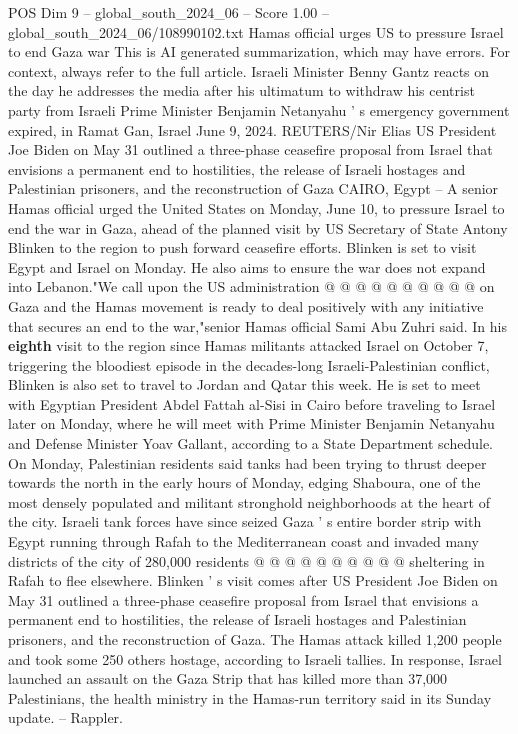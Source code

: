 \begin{textsample}{POS Dim 9 – global\_south\_2024\_06 – Score 1.00 – global\_south\_2024\_06/108990102.txt}  \label{ex:f9_pos_056}
Hamas official urges US to pressure Israel to end Gaza war This is AI generated summarization, which may have errors.
For context, always refer to the full article.
Israeli Minister Benny Gantz reacts on the day he addresses the media after his ultimatum to withdraw his centrist party from Israeli Prime Minister Benjamin Netanyahu ' s emergency government expired, in Ramat Gan, Israel June 9, 2024.
REUTERS/Nir Elias US President Joe Biden on May 31 outlined a three-phase ceasefire proposal from Israel that envisions a permanent end to hostilities, the release of Israeli hostages and Palestinian prisoners, and the reconstruction of Gaza CAIRO, Egypt -- A senior Hamas official urged the United States on Monday, June 10, to pressure Israel to end the war in Gaza, ahead of the planned visit by US Secretary of State Antony Blinken to the region to push forward ceasefire efforts.
Blinken is set to visit Egypt and Israel on Monday.
He also aims to ensure the war does not expand into Lebanon."We call upon the US administration @ @ @ @ @ @ @ @ @ @ on Gaza and the Hamas movement is ready to deal positively with any initiative that secures an end to the war,"senior Hamas official Sami Abu Zuhri said.
In his \textbf{eighth} visit to the region since Hamas militants attacked Israel on October 7, triggering the bloodiest episode in the decades-long Israeli-Palestinian conflict, Blinken is also set to travel to Jordan and Qatar this week.
He is set to meet with Egyptian President Abdel Fattah al-Sisi in Cairo before traveling to Israel later on Monday, where he will meet with Prime Minister Benjamin Netanyahu and Defense Minister Yoav Gallant, according to a State Department schedule.
On Monday, Palestinian residents said tanks had been trying to thrust deeper towards the north in the early hours of Monday, edging Shaboura, one of the most densely populated and militant stronghold neighborhoods at the heart of the city.
Israeli tank forces have since seized Gaza ' s entire border strip with Egypt running through Rafah to the Mediterranean coast and invaded many districts of the city of 280,000 residents @ @ @ @ @ @ @ @ @ @ sheltering in Rafah to flee elsewhere.
Blinken ' s visit comes after US President Joe Biden on May 31 outlined a three-phase ceasefire proposal from Israel that envisions a permanent end to hostilities, the release of Israeli hostages and Palestinian prisoners, and the reconstruction of Gaza.
The Hamas attack killed 1,200 people and took some 250 others hostage, according to Israeli tallies.
In response, Israel launched an assault on the Gaza Strip that has killed more than 37,000 Palestinians, the health ministry in the Hamas-run territory said in its Sunday update. -- Rappler.

\end{textsample}
